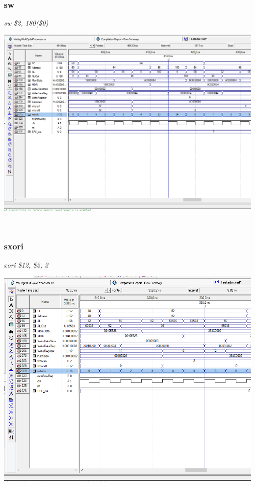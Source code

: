 \documentclass{article}
\begin{document}
    \\
    \subsubsection{sw}
    {\it sw \$2, 180(\$0)}\\
    \begin{center}
        \includegraphics[scale=0.25]{sw.PNG}
    \end{center}
    
    \\
    \subsubsection{sxori}
    {\it xori \$12, \$2, 2}\\
    \begin{center}
        \includegraphics[scale=0.25]{xori.PNG}
    \end{center}
    
\end{document}
